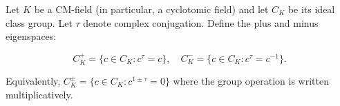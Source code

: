 Let $K$ be a CM-field (in particular, a cyclotomic field) and let $C_K$ be its ideal class group. Let $\tau$ denote complex conjugation. Define the plus and minus eigenspaces:

$$C_K^+ = \{ c \in C_K : c^{\tau} = c \}, \quad C_K^- = \{ c \in C_K : c^{\tau} = c^{-1} \}.$$

Equivalently, $C_K^{\pm} = \{ c \in C_K : c^{1 \pm \tau} = 0 \}$ where the group operation is written multiplicatively.
